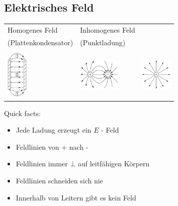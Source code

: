 \subsection{Elektrisches Feld}
    \begin{tabular}{l|l l}
        Homogenes Feld & Inhomogenes Feld & 
        \\(Plattenkondensator) & (Punktladung) & 
        \\
        \\\includegraphics[width = 10mm]{src/images/kondensator.png} & \includegraphics[width = 21mm]{src/images/zwei_punktladung.png} & \includegraphics[width = 15mm]{src/images/punktladung.png}
    \end{tabular}
    \vspace{2mm}

    Quick facts:
    \begin{itemize}
        \item Jede Ladung erzeugt ein $E$ - Feld \vspace{-1mm}
        \item Feldlinien von + nach - \vspace{-1mm}
        \item Feldlinien immer $\bot$ auf leitfähigen Körpern \vspace{-1mm}
        \item Feldlinien schneiden sich nie \vspace{-1mm}
        \item Innerhalb von Leitern gibt es kein Feld
    \end{itemize}


